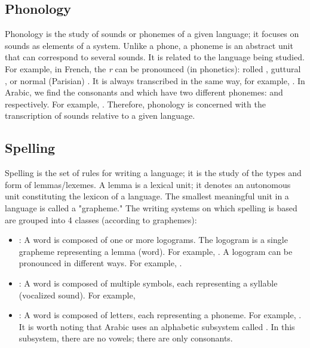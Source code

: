 \documentclass{KBook}
\begin{document}
\setlength\tabcolsep{6pt}


\subsection{Phonology}

Phonology is the study of sounds or phonemes of a given language; it focuses on sounds as elements of a system. Unlike a phone, a phoneme is an abstract unit that can correspond to several sounds. It is related to the language being studied. For example, in French, the \textit{r} can be pronounced (in phonetics): rolled \expword{\textipa{[r]}}, guttural \expword{\textipa{[\;R]}}, or normal (Parisian) \expword{\textipa{[K]}}. It is always transcribed in the same way, for example, . In Arabic, we find the consonants  and  which have two different phonemes:  and  respectively. For example, . Therefore, phonology is concerned with the transcription of sounds relative to a given language.

\subsection{Spelling}

Spelling is the set of rules for writing a language; it is the study of the types and form of lemmas/lexemes. A lemma is a lexical unit; it denotes an autonomous unit constituting the lexicon of a language. The smallest meaningful unit in a language is called a "grapheme." The writing systems on which spelling is based are grouped into 4 classes (according to graphemes):
\begin{itemize}
	\item {}: A word is composed of one or more logograms. The logogram is a single grapheme representing a lemma (word). For example, . A logogram can be pronounced in different ways. For example, .
	
	\item {}: A word is composed of multiple symbols, each representing a syllable (vocalized sound). For example, 
	
	\item {}: A word is composed of letters, each representing a phoneme. For example, . It is worth noting that Arabic uses an alphabetic subsystem called . In this subsystem, there are no vowels; there are only consonants.
\end{itemize}
\end{document}
